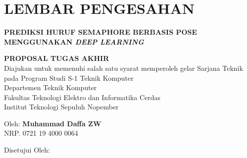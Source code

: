 \chapter*{LEMBAR PENGESAHAN}

\thispagestyle{empty}

\begin{center}
  \textbf{PREDIKSI HURUF SEMAPHORE BERBASIS POSE MENGGUNAKAN \emph{DEEP LEARNING}}
\end{center}

\begingroup
\small

\begin{center}
  \textbf{PROPOSAL TUGAS AKHIR} \\
  Diajukan untuk memenuhi salah satu syarat memperoleh gelar
  Sarjana Teknik pada
  Program Studi S-1 Teknik Komputer \\
  Departemen Teknik Komputer \\
  Fakultas Teknologi Elektro  dan Informatika Cerdas \\
  Institut Teknologi Sepuluh Nopember
\end{center}

\begin{center}
  Oleh: \textbf{Muhammad Daffa ZW} \\
  NRP. 0721 19 4000 0064
\end{center}

\begin{center}
  Disetujui Oleh:
\end{center}

\vspace{10ex}

\begingroup
\setlength{\tabcolsep}{0pt}


